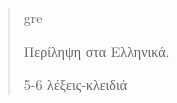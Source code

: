 \begin{abstract}
    \markboth{\abstractname}{}

\begin{scontents}[store-env=lang]
gre
\end{scontents}

\begin{scontents}[store-env=abstracts,print-env=true]
Περίληψη στα Ελληνικά.
\end{scontents}

\begin{scontents}[store-env=keywords,print-env=true]
5-6 λέξεις-κλειδιά
\end{scontents}
\end{abstract}
\cleardoublepage
{}

